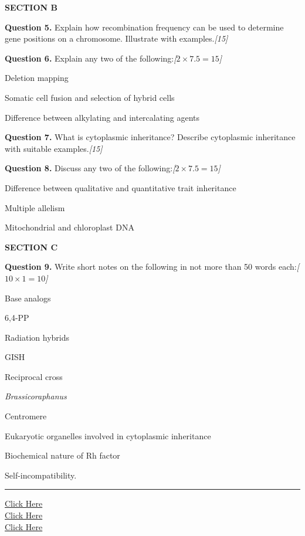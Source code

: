 \documentclass[11pt,a4paper]{article}
\newcommand{\pts}[1]{\hfill   \textit{[#1]}}
\begin{document}
\bigskip

\begin{center}
   \textbf{SECTION B}
\end{center}
\medskip

\medskip


\noindent   \textbf{Question 5.} Explain how recombination frequency can be used to determine gene positions on a chromosome. Illustrate with examples.\pts{15}

\medskip


\noindent   \textbf{Question 6.} Explain any two of the following:\pts{$2  \times 7.5 = 15$}

\begin{parts}
  \item Deletion mapping
  \item Somatic cell fusion and selection of hybrid cells
  \item Difference between alkylating and intercalating agents
\end{parts}

\medskip


\noindent   \textbf{Question 7.} What is cytoplasmic inheritance? Describe cytoplasmic inheritance with suitable examples.\pts{15}

\medskip


\noindent   \textbf{Question 8.} Discuss any two of the following:\pts{$2  \times 7.5 = 15$}

\begin{parts}
  \item Difference between qualitative and quantitative trait inheritance
  \item Multiple allelism
  \item Mitochondrial and chloroplast DNA
\end{parts}

\bigskip

\begin{center}
   \textbf{SECTION C}
\end{center}
\medskip

\medskip


\noindent   \textbf{Question 9.} Write short notes on the following in not more than 50 words each:\pts{$10  \times 1 = 10$}

\begin{parts}
  \item Base analogs
  \item 6,4-PP
  \item Radiation hybrids
  \item GISH
  \item Reciprocal cross
  \item   \textit{Brassicoraphanus}
  \item Centromere
  \item Eukaryotic organelles involved in cytoplasmic inheritance
  \item Biochemical nature of Rh factor
  \item Self-incompatibility.
\end{parts}

\vfill
\rule{\linewidth}{0.4pt}

\begin{center}\small
\href{https://bhu-exam.vercel.app/}{Click Here}\\[4pt]\href{https://me-aryan.vercel.app/}{Click Here}\\[4pt]\href{https://quashan-me.vercel.app/}{Click Here}
\end{center}
\end{document}
